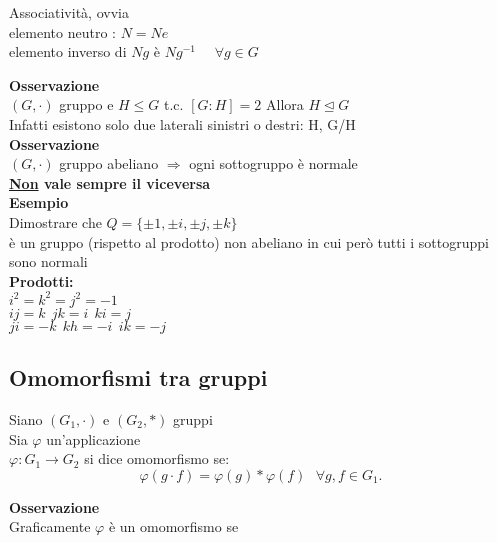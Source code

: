 \documentclass[12px]{article}
\begin{document}
{\begin{dimo}
	 	Associatività, ovvia\\
		elemento neutro : $N=Ne$\\
		elemento inverso di  $Ng$ è $Ng^{-1}$ \ \  $\forall g\in G$
	 \end{dimo}
	 \textbf{Osservazione}\\
	 $(G,\cdot)$ gruppo e $H\leq G$ t.c.  $[G:H] = 2$ Allora  $H\trianglelefteq G$\\
	 Infatti esistono solo due laterali sinistri o destri: H, G/H\\
	 \textbf{Osservazione}\\
	 $(G,\cdot)$ gruppo abeliano $\Rightarrow$ ogni sottogruppo è normale\\
	 \textbf{\underline{Non} vale sempre il viceversa}\\
	 \textbf{Esempio}\\
	 Dimostrare che $Q = \lbrace \pm 1, \pm i,\pm j,\pm k\rbrace$\\ 
	 è un gruppo (rispetto al prodotto)
	 non abeliano in cui però tutti i sottogruppi sono normali\\
	  \textbf{Prodotti:}\\
	  $i^2 = k^2 = j^2 = -1$\\
	   $ij = k \ \ jk = i \ \ ki = j$\\
	    $ji = -k \ \ kh = -i \ \ ik = -j$

	   \subsection{Omomorfismi tra gruppi}
	 \begin{defi}
		Siano $(G_1,\cdot)$ e $(G_2,*)$ gruppi\\
		Sia $ \varphi$ un'applicazione\\
		$
		\varphi: G_1  \rightarrow G_2$ si dice omomorfismo se:
		\[
		\varphi(g\cdot f) = \varphi(g)* \varphi(f) \ \ \ \forall g,f\in G_1
		.\] 
		
	\end{defi}
	\textbf{Osservazione}\\
	Graficamente $ \varphi$ è un omomorfismo se
	
}
\end{document}
